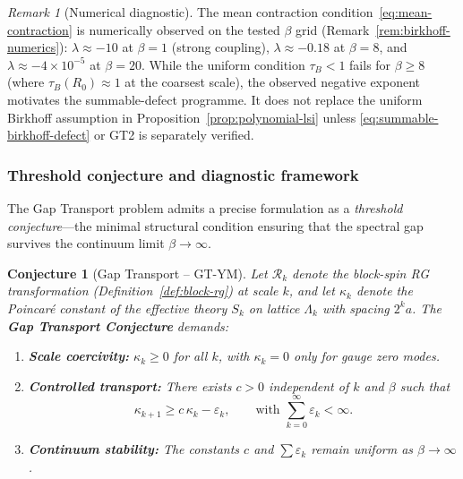\documentclass[12pt,a4paper]{article}
\theoremstyle{definition}
\theoremstyle{plain}
\newtheorem{conjecture}[definition]{Conjecture}
\theoremstyle{remark}
\newtheorem{remark}[definition]{Remark}
\begin{document}
\begin{remark}[Numerical diagnostic]\label{rem:kingman-numerical}
The mean contraction condition~\eqref{eq:mean-contraction} is numerically observed on the tested $\beta$ grid (Remark~\ref{rem:birkhoff-numerics}): $\lambda \approx -10$ at $\beta=1$ (strong coupling), $\lambda \approx -0.18$ at $\beta=8$, and $\lambda \approx -4 \times 10^{-5}$ at $\beta=20$. While the uniform condition $\tau_B < 1$ fails for $\beta \geq 8$ (where $\tau_B(R_0) \approx 1$ at the coarsest scale), the observed negative exponent motivates the summable-defect programme. It does not replace the uniform Birkhoff assumption in Proposition~\ref{prop:polynomial-lsi} unless \eqref{eq:summable-birkhoff-defect} or GT2 is separately verified.
\end{remark}

\subsubsection*{Threshold conjecture and diagnostic framework}

The Gap Transport problem admits a precise formulation as a \emph{threshold conjecture}---the minimal structural condition ensuring that the spectral gap survives the continuum limit $\beta \to \infty$.

\begin{conjecture}[Gap Transport -- GT-YM]\label{ax:gt-ym}
Let $\mathcal{R}_k$ denote the block-spin RG transformation (Definition~\ref{def:block-rg}) at scale $k$, and let $\kappa_k$ denote the Poincar\'e constant of the effective theory $S_k$ on lattice $\Lambda_k$ with spacing $2^k a$. The \textbf{Gap Transport Conjecture} demands:
\begin{enumerate}
\item[(GT1)] \textbf{Scale coercivity:} $\kappa_k \geq 0$ for all $k$, with $\kappa_k = 0$ only for gauge zero modes.
\item[(GT2)] \textbf{Controlled transport:} There exists $c > 0$ independent of $k$ and $\beta$ such that
\begin{equation}\label{eq:gap-transport}
  \kappa_{k+1} \geq c\, \kappa_k - \varepsilon_k, \qquad \text{with } \sum_{k=0}^{\infty} \varepsilon_k < \infty.
\end{equation}
\item[(GT3)] \textbf{Continuum stability:} The constants $c$ and $\sum \varepsilon_k$ remain uniform as $\beta \to \infty$.
\end{enumerate}
\end{conjecture}
\end{document}

